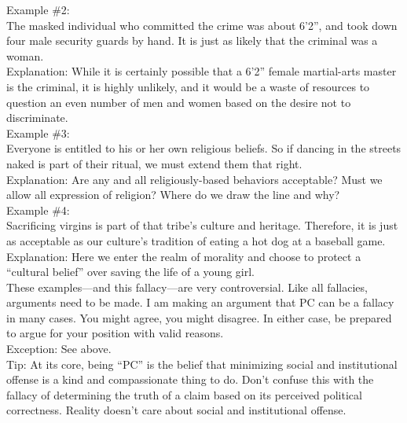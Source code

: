 \documentclass[a4paper,12pt,single,pdftex]{scrartcl}
\begin{document}
    
      Example \#2:
    \\

    
      The masked individual who committed the crime was about 6’2”, and took down four male security guards by hand.  It is just as likely that the criminal was a woman.
    \\

    
      Explanation: While it is certainly possible that a 6’2” female martial-arts master is the criminal, it is highly unlikely, and it would be a waste of resources to question an even number of men and women based on the desire not to discriminate.
    \\

    
      Example \#3:
    \\

    
      Everyone is entitled to his or her own religious beliefs.  So if dancing in the streets naked is part of their ritual, we must extend them that right.
    \\

    
      Explanation: Are any and all religiously-based behaviors acceptable?  Must we allow all expression of religion?  Where do we draw the line and why?
    \\

    
      Example \#4:
    \\

    
      Sacrificing virgins is part of that tribe's culture and heritage.  Therefore, it is just as acceptable as our culture’s tradition of eating a hot dog at a baseball game.
    \\

    
      Explanation: Here we enter the realm of morality and choose to protect a “cultural belief” over saving the life of a young girl. 
    \\

    
      These examples—and this fallacy—are very controversial.  Like all fallacies, arguments need to be made.  I am making an argument that PC can be a fallacy in many cases.  You might agree, you might disagree.  In either case, be prepared to argue for your position with valid reasons.
    \\

    
      Exception: See above.
    \\

    
      Tip: At its core, being “PC” is the belief that minimizing social and institutional offense is a kind and compassionate thing to do. Don’t confuse this with the fallacy of determining the truth of a claim based on its perceived political correctness. Reality doesn’t care about social and institutional offense.
    \\
\end{document}
